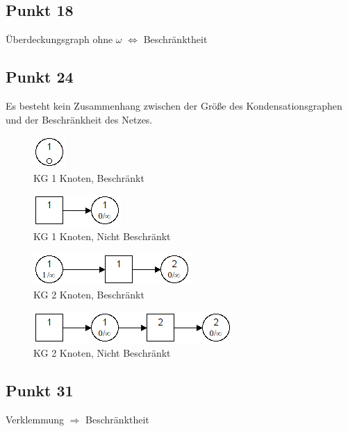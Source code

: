 \documentclass[10pt]{scrartcl}
\begin{document}
			\subsection{Punkt 18}
			Überdeckungsgraph ohne $\omega$ $\Longleftrightarrow$ Beschränktheit 	 
			
			\subsection{Punkt 24}	
			Es besteht kein Zusammenhang zwischen der Größe des Kondensationsgraphen und der Beschränkheit des Netzes.	
			\begin{figure}[H]
    				\centering	
					\includegraphics[scale=0.5]{aufg0241.png}		
            		\caption{KG 1 Knoten, Beschränkt}
				\end{figure}
				\begin{figure}[H]
    				\centering	
					\includegraphics[scale=0.5]{aufg0242.png}		
            		\caption{KG 1 Knoten, Nicht Beschränkt}
				\end{figure}
				\begin{figure}[H]
    				\centering	
					\includegraphics[scale=0.5]{aufg0243.png}		
            		\caption{KG 2 Knoten, Beschränkt}
				\end{figure}
				\begin{figure}[H]
    				\centering	
					\includegraphics[scale=0.5]{aufg0244.png}		
            		\caption{KG 2 Knoten, Nicht Beschränkt}
				\end{figure}	
				
				\subsection{Punkt 31}
				Verklemmung $\Longrightarrow$ Beschränktheit
			
\end{document}
